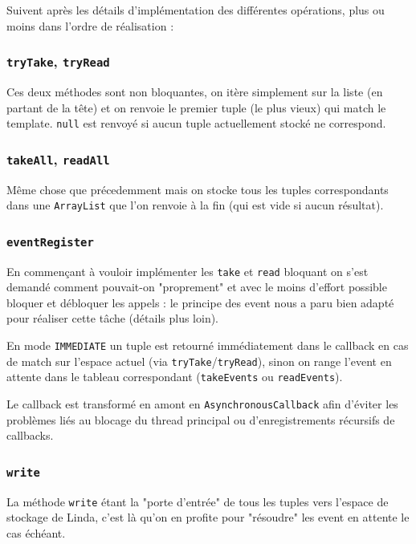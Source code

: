 \documentclass[headings=standardclasses,parskip=half]{scrartcl}
\begin{document}
Suivent après les détails d'implémentation des différentes opérations,
plus ou moins dans l'ordre de réalisation :

\subsubsection{\texttt{tryTake}, \texttt{tryRead}}

Ces deux méthodes sont non bloquantes, on itère simplement sur la liste
(en partant de la tête) et on renvoie le premier tuple (le plus vieux)
qui match le template. \texttt{null} est renvoyé si aucun tuple
actuellement stocké ne correspond.

\subsubsection{\texttt{takeAll}, \texttt{readAll}}

Même chose que précedemment mais on stocke tous les tuples correspondants
dans une \texttt{ArrayList} que l'on renvoie à la fin (qui est vide
si aucun résultat).

\subsubsection{\texttt{eventRegister}}

En commençant à vouloir implémenter les \texttt{take} et \texttt{read}
bloquant on s'est demandé comment pouvait-on "proprement" et avec le
moins d'effort possible bloquer et débloquer les appels : le principe
des event nous a paru bien adapté pour réaliser cette tâche
(détails plus loin).

En mode \texttt{IMMEDIATE} un tuple est retourné immédiatement dans
le callback en cas de match sur l'espace actuel
(via \texttt{tryTake}/\texttt{tryRead}),
sinon on range l'event en attente dans le tableau correspondant
(\texttt{takeEvents} ou \texttt{readEvents}).

Le callback est transformé en amont en \texttt{AsynchronousCallback}
afin d'éviter les problèmes liés au blocage du thread principal ou
d'enregistrements récursifs de callbacks.

\subsubsection{\texttt{write}}

La méthode \texttt{write} étant la "porte d'entrée" de tous les tuples
vers l'espace de stockage de Linda, c'est là qu'on en profite pour
"résoudre" les event en attente le cas échéant.
\end{document}
